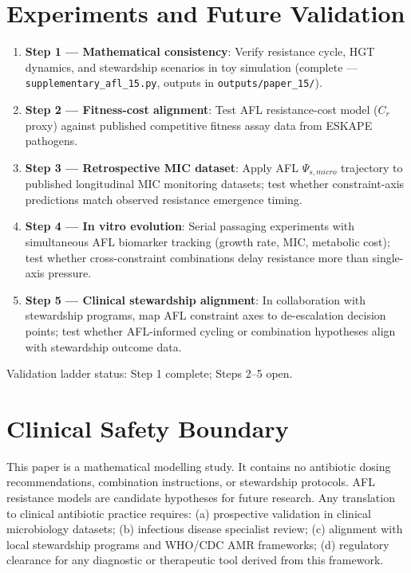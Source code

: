 \documentclass[11pt]{article}
\begin{document}
\section{Experiments and Future Validation}

\begin{enumerate}
  \item \textbf{Step 1 --- Mathematical consistency}: Verify resistance cycle, HGT dynamics, and stewardship scenarios in toy simulation (complete --- \texttt{supplementary\_afl\_15.py}, outputs in \texttt{outputs/paper\_15/}).
  \item \textbf{Step 2 --- Fitness-cost alignment}: Test AFL resistance-cost model ($C_r$ proxy) against published competitive fitness assay data from ESKAPE pathogens.
  \item \textbf{Step 3 --- Retrospective MIC dataset}: Apply AFL $\Psi_{s,micro}$ trajectory to published longitudinal MIC monitoring datasets; test whether constraint-axis predictions match observed resistance emergence timing.
  \item \textbf{Step 4 --- In vitro evolution}: Serial passaging experiments with simultaneous AFL biomarker tracking (growth rate, MIC, metabolic cost); test whether cross-constraint combinations delay resistance more than single-axis pressure.
  \item \textbf{Step 5 --- Clinical stewardship alignment}: In collaboration with stewardship programs, map AFL constraint axes to de-escalation decision points; test whether AFL-informed cycling or combination hypotheses align with stewardship outcome data.
\end{enumerate}

Validation ladder status: Step 1 complete; Steps 2--5 open.

\section{Clinical Safety Boundary}

This paper is a mathematical modelling study. It contains no antibiotic dosing recommendations, combination instructions, or stewardship protocols. AFL resistance models are candidate hypotheses for future research. Any translation to clinical antibiotic practice requires: (a) prospective validation in clinical microbiology datasets; (b) infectious disease specialist review; (c) alignment with local stewardship programs and WHO/CDC AMR frameworks; (d) regulatory clearance for any diagnostic or therapeutic tool derived from this framework.
\end{document}
